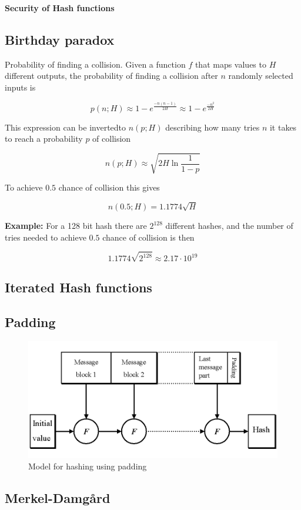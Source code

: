 \textbf{Security of Hash functions} 



\subsection{Birthday paradox}
Probability of finding a collision. Given a function $f$ that maps
values to $H$ different outputs, the probability of finding a
collision after $n$ randomly selected inputs is

\[ p(n; H) \approx 1 - e^{\frac{-n(n-1)}{2H}} \approx 1 - e^{\frac{-n^2}{2H}} \]

This expression can be invertedto $n(p; H)$ describing how many tries
$n$ it takes to reach a probability $p$ of collision

\[ n(p; H) \approx \sqrt{2H \ln \frac{1}{1 - p}} \]

To achieve $0.5$ chance of collision this gives

\[ n(0.5; H) = 1.1774 \sqrt{H} \]

\textbf{Example:} For a 128 bit hash there are $2^{128}$ different
hashes, and the number of tries needed to achieve $0.5$ chance of
collision is then

\[ 1.1774 \sqrt{2^{128}} \approx 2.17 \cdot 10^{19} \]

\subsection{Iterated Hash functions}


\subsection{Padding}
\begin{figure}[H]
  \centering
  \includegraphics[scale=0.3]{images/10-padding}
  \caption{Model for hashing using padding}
\end{figure}

\subsection{Merkel-Damgård}
